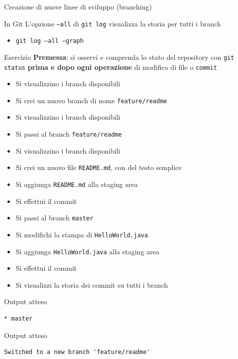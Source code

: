 \documentclass[xcolor=dvipsnames,presentation]{beamer}
\begin{document}
\begin{frame}{Creazione di nuove linee di sviluppo (branching)}
\begin{block}{In Git}
        L'opzione \texttt{--all} di \texttt{git log} visualizza la storia per tutti i branch
        \begin{itemize}
            \item \texttt{git log --all --graph}
        \end{itemize}
    \end{block}
    \begin{block}{Esercizio}
        \textbf{Premessa}: si osservi e comprenda lo stato del repository con \texttt{git status} \textbf{prima e dopo ogni operazione} di modifica di file o \texttt{commit}
        \begin{itemize}
            \footnotesize
            \item Si visualizzino i branch disponibili
            \item Si crei un nuovo branch di nome \texttt{feature/readme}
            \item Si visualizzino i branch disponibili
            \item Si passi al branch \texttt{feature/readme}
            \item Si visualizzino i branch disponibili
            \item Si crei un nuovo file \texttt{README.md}, con del testo semplice
            \item Si aggiunga \texttt{README.md} alla staging area
            \item Si effettui il commit
            \item Si passi al branch \texttt{master}
            \item Si modifichi la stampa di \texttt{HelloWorld.java}
            \item Si aggiunga \texttt{HelloWorld.java} alla staging area
            \item Si effettui il commit
            \item Si visualizzi la storia dei commit su tutti i branch
        \end{itemize}
    \end{block}
    \begin{block}{Output atteso}
        \begin{Verbatim}[fontsize=\scriptsize]
* master
        \end{Verbatim}
    \end{block}
    \begin{block}{Output atteso}
        \begin{Verbatim}[fontsize=\scriptsize]
Switched to a new branch 'feature/readme'

\end{Verbatim}
\end{block}
\end{frame}
\end{document}
